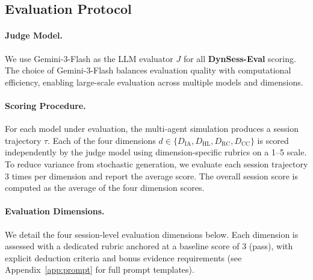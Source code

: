 \subsection{Evaluation Protocol}
\label{app:evaluation_protocol}

\paragraph{Judge Model.}
We use Gemini-3-Flash as the LLM evaluator $J$ for all \textbf{DynSess-Eval} scoring. The choice of Gemini-3-Flash balances evaluation quality with computational efficiency, enabling large-scale evaluation across multiple models and dimensions.

\paragraph{Scoring Procedure.}
For each model under evaluation, the multi-agent simulation produces a session trajectory $\tau$. Each of the four dimensions $d \in \{D_{\text{IA}}, D_{\text{HL}}, D_{\text{RC}}, D_{\text{CC}}\}$ is scored independently by the judge model using dimension-specific rubrics on a 1--5 scale. To reduce variance from stochastic generation, we evaluate each session trajectory 3 times per dimension and report the average score. The overall session score is computed as the average of the four dimension scores.

\paragraph{Evaluation Dimensions.}
We detail the four session-level evaluation dimensions below. Each dimension is assessed with a dedicated rubric anchored at a baseline score of 3 (pass), with explicit deduction criteria and bonus evidence requirements (see Appendix~\ref{app:prompt} for full prompt templates).

